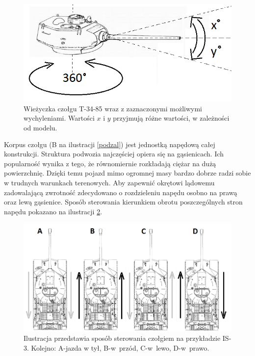   \begin{figure}[H]
    \begin{center}
      \includegraphics[scale=0.55]{imgs/wiezyczka.png}
 	\caption[Wieżyczka \textit{T-34-85}]{\small{Wieżyczka czołgu T-34-85 wraz z zaznaczonymi możliwymi wychyleniami. Wartości $x$ i $y$ przyjmują różne wartości, w zależności od modelu.}\footnotemark[13]}
	\label{wez_czolg}
    \end{center}
  \end{figure}

Korpus czołgu (B na ilustracji \ref{podzal}) jest jednostką napędową całej konstrukcji. Struktura podwozia najczęściej opiera się na gąsienicach. Ich popularność wynika z tego, że równomiernie rozkładają ciężar na dużą powierzchnię. Dzięki temu pojazd mimo ogromnej masy bardzo dobrze radzi sobie w trudnych warunkach terenowych. Aby zapewnić okrętowi lądowemu zadowalającą zwrotność zdecydowano o rozdzieleniu napędu osobno na prawą oraz lewą gąsienice. Sposób sterowania kierunkiem obrotu poszczególnych stron napędu pokazano na ilustracji \ref{ster}. 

  \begin{figure}[H]
    \begin{center}
      \includegraphics[scale=0.45]{imgs/ster.png}
 	\caption[Czołg \textit{IS-3} - sterowanie]{\small{Ilustracja przedstawia sposób sterowania czołgiem na przykładzie IS-3. Kolejno: A-jazda w tył, B-w~przód, C-w~lewo, D-w~prawo.}\footnotemark[14]}
	\label{ster}
    \end{center}
  \end{figure}

